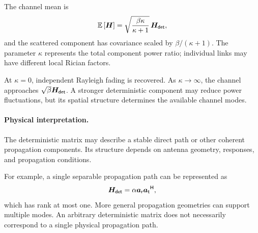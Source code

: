 The channel mean is
\begin{equation*}
	\mathbb{E}\left[\bm{H}\right]
	=\sqrt{\frac{\beta \kappa}{\kappa+1}}\,
	\bm{H}_{\mathsf{det}},
\end{equation*}
and the scattered component has covariance scaled
by $\beta/(\kappa+1)$.
The parameter $\kappa$ represents the total component
power ratio; individual links may have different
local Rician factors.

At $\kappa=0$, independent Rayleigh fading is recovered.
As $\kappa\to\infty$, the channel approaches
$\sqrt{\beta}\bm{H}_{\mathsf{det}}$.
A stronger deterministic component may reduce
power fluctuations, but its spatial structure
determines the available channel modes.

\paragraph{Physical interpretation.}
The deterministic matrix may describe a stable
direct path or other coherent propagation components.
Its structure depends on antenna geometry, responses,
and propagation conditions.

For example, a single separable propagation path
can be represented as
\begin{equation*}
	\bm{H}_{\mathsf{det}}
	=\alpha\bm{a}_{\mathsf r}
	{\bm{a}_{\mathsf t}}^{\mathsf{H}},
\end{equation*}
which has rank at most one.
More general propagation geometries can support
multiple modes. An arbitrary deterministic matrix
does not necessarily correspond to a single
physical propagation path.

